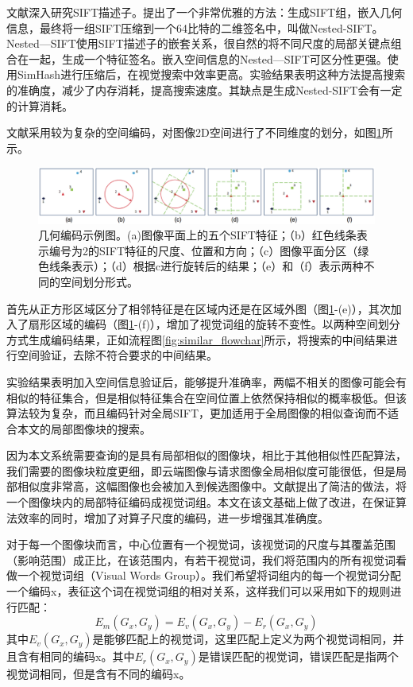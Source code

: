 文献\cite{Xu:2013wc}深入研究SIFT描述子。提出了一个非常优雅的方法：生成SIFT组，嵌入几何信息，最终将一组SIFT压缩到一个64比特的二维签名中，叫做Nested-SIFT。Nested—SIFT使用SIFT描述子的嵌套关系，很自然的将不同尺度的局部关键点组合在一起，生成一个特征签名。嵌入空间信息的Nested—SIFT可区分性更强。使用SimHash进行压缩后，在视觉搜索中效率更高。实验结果表明这种方法提高搜索的准确度，减少了内存消耗，提高搜索速度。其缺点是生成Nested-SIFT会有一定的计算消耗。

文献\cite{Zhou:2013jz}采用较为复杂的空间编码，对图像2D空间进行了不同维度的划分，如图\ref{fig:geo_coding}所示。
\begin{figure}
\centering\includegraphics[width=15cm]{imgs/ch3/geo_coding}
\caption{几何编码示例图。(a)图像平面上的五个SIFT特征；（b）红色线条表示编号为2的SIFT特征的尺度、位置和方向；（c）图像平面分区（绿色线条表示）；（d）根据c进行旋转后的结果；（e）和（f）表示两种不同的空间划分形式。}
\label{fig:geo_coding}
\end{figure}

首先从正方形区域区分了相邻特征是在区域内还是在区域外图（图\ref{fig:geo_coding}-(e)），其次加入了扇形区域的编码（图\ref{fig:geo_coding}-(f)），增加了视觉词组的旋转不变性。以两种空间划分方式生成编码结果，正如流程图\ref{fig:similar_flowchar}所示，将搜索的中间结果进行空间验证，去除不符合要求的中间结果。

实验结果表明加入空间信息验证后，能够提升准确率，两幅不相关的图像可能会有相似的特征集合，但是相似特征集合在空间位置上依然保持相似的概率极低。但该算法较为复杂，而且编码针对全局SIFT，更加适用于全局图像的相似查询而不适合本文的局部图像块的搜索。

因为本文系统需要查询的是具有局部相似的图像块，相比于其他相似性匹配算法，我们需要的图像块粒度更细，即云端图像与请求图像全局相似度可能很低，但是局部相似度非常高，这幅图像也会被加入到候选图像中。文献\cite{Dai:2012vn}提出了简洁的做法，将一个图像块内的局部特征编码成视觉词组。本文在该文基础上做了改进，在保证算法效率的同时，增加了对算子尺度的编码，进一步增强其准确度。

对于每一个图像块而言，中心位置有一个视觉词，该视觉词的尺度与其覆盖范围（影响范围）成正比，在该范围内，有若干视觉词，我们将范围内的所有视觉词看做一个视觉词组（Visual Words Group）。我们希望将词组内的每一个视觉词分配一个编码x，表征这个词在视觉词组的相对关系，这样我们可以采用如下的规则进行匹配：
\begin{equation}
E_m(G_x,G_y) = E_v(G_x,G_y) - E_r(G_x,G_y)
\end{equation}
其中\(E_v(G_x,G_y)\)是能够匹配上的视觉词，这里匹配上定义为两个视觉词相同，并且含有相同的编码x。其中\(E_r(G_x,G_y)\)是错误匹配的视觉词，错误匹配是指两个视觉词相同，但是含有不同的编码x。

